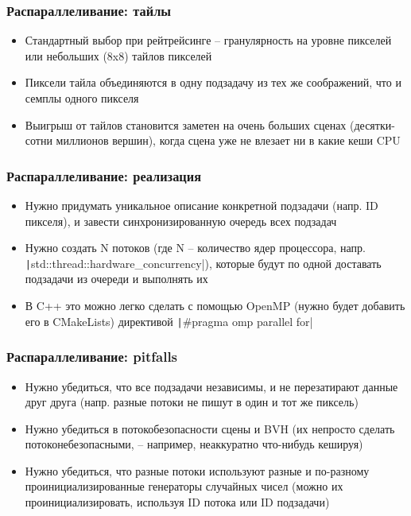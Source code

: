 \documentclass[10pt]{beamer}
\begin{document}
\begin{frame}[fragile]
\frametitle{Распараллеливание: тайлы}
\begin{itemize}
\item Стандартный выбор при рейтрейсинге -- гранулярность на уровне пикселей или небольших (8x8) тайлов пикселей
\pause
\item Пиксели тайла объединяются в одну подзадачу из тех же соображений, что и семплы одного пикселя
\pause
\item Выигрыш от тайлов становится заметен на очень больших сценах (десятки-сотни миллионов вершин), когда сцена уже не влезает ни в какие кеши CPU
\end{itemize}
\end{frame}

\begin{frame}[fragile]
\frametitle{Распараллеливание: реализация}
\begin{itemize}
\item Нужно придумать уникальное описание конкретной подзадачи (напр. ID пикселя), и завести синхронизированную очередь всех подзадач
\pause
\item Нужно создать N потоков (где N -- количество ядер процессора, напр. \texttt|std::thread::hardware_concurrency|), которые будут по одной доставать подзадачи из очереди и выполнять их
\pause
\item В C++ это можно легко сделать с помощью OpenMP (нужно будет добавить его в CMakeLists) директивой \texttt|#pragma omp parallel for|
\end{itemize}
\end{frame}

\begin{frame}[fragile]
\frametitle{Распараллеливание: pitfalls}
\begin{itemize}
\item Нужно убедиться, что все подзадачи независимы, и не перезатирают данные друг друга (напр. разные потоки не пишут в один и тот же пиксель)
\pause
\item Нужно убедиться в потокобезопасности сцены и BVH (их непросто сделать потоконебезопасными, -- например, неаккуратно что-нибудь кешируя)
\pause
\item Нужно убедиться, что разные потоки используют разные и по-разному проинициализированные генераторы случайных чисел (можно их проинициализировать, используя ID потока или ID подзадачи)
\end{itemize}
\end{frame}
\end{document}
